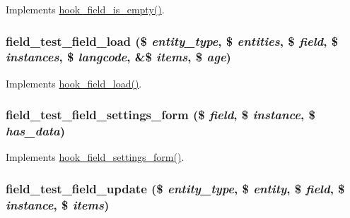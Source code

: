 \label{field__test_8field_8inc_a6334e0fe1febc5e87cfa9f2f5eabf57e}
Implements \hyperlink{group__field__types_ga192dd7e7a02a7bc9e0af8b67b187b071}{hook\_\-field\_\-is\_\-empty()}. \hypertarget{field__test_8field_8inc_a35f039a5f1cc50656fa18cd9f4089dc5}{
\subsubsection[{field\_\-test\_\-field\_\-load}]{\setlength{\rightskip}{0pt plus 5cm}field\_\-test\_\-field\_\-load (\$ {\em entity\_\-type}, \/  \$ {\em entities}, \/  \$ {\em field}, \/  \$ {\em instances}, \/  \$ {\em langcode}, \/  \&\$ {\em items}, \/  \$ {\em age})}}
\label{field__test_8field_8inc_a35f039a5f1cc50656fa18cd9f4089dc5}
Implements \hyperlink{group__field__types_ga37f2456e9b5b8b39dc11cffd59163c19}{hook\_\-field\_\-load()}. \hypertarget{field__test_8field_8inc_a2f0acb45a789bf7e14b2e3262353e673}{
\subsubsection[{field\_\-test\_\-field\_\-settings\_\-form}]{\setlength{\rightskip}{0pt plus 5cm}field\_\-test\_\-field\_\-settings\_\-form (\$ {\em field}, \/  \$ {\em instance}, \/  \$ {\em has\_\-data})}}
\label{field__test_8field_8inc_a2f0acb45a789bf7e14b2e3262353e673}
Implements \hyperlink{group__field__types_gab8a2ed808857cc6f3cb661fbc99d30d4}{hook\_\-field\_\-settings\_\-form()}. \hypertarget{field__test_8field_8inc_a199206c85728b6a0bf45265ceb8a0a9c}{
\subsubsection[{field\_\-test\_\-field\_\-update}]{\setlength{\rightskip}{0pt plus 5cm}field\_\-test\_\-field\_\-update (\$ {\em entity\_\-type}, \/  \$ {\em entity}, \/  \$ {\em field}, \/  \$ {\em instance}, \/  \$ {\em items})}}
